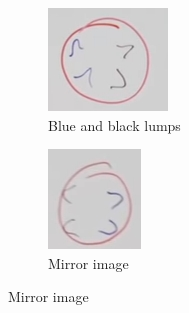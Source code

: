 \documentclass[]{article}
\begin{document}
\begin{figure}[H]
	\caption{Annihilation of lumps and anti-lumps}\label{fig:lump:antilump}
	\begin{subfigure}{0.3\textwidth}
		\caption{Blue and black lumps}
		\includegraphics[width=\textwidth]{aqm-5-lumps}
	\end{subfigure}
	\begin{subfigure}{0.3\textwidth}
		\caption{Mirror image}
		\includegraphics[width=\textwidth]{aqm-5-anti-lumps}

\end{subfigure}
\end{figure}
\end{document}
